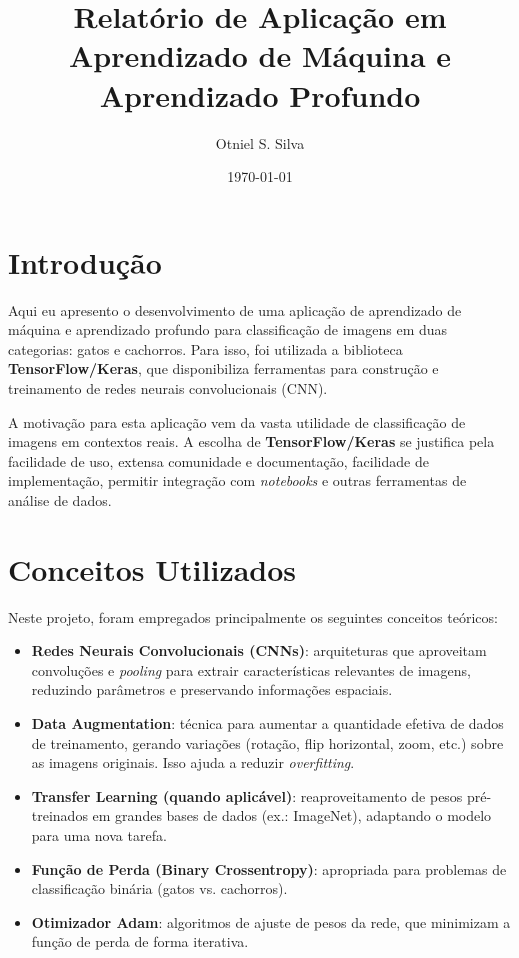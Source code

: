 \documentclass[a4paper,12pt]{article}
\title{Relatório de Aplicação em Aprendizado de Máquina e Aprendizado Profundo}
\author{Otniel S. Silva}
\date{\today}
\begin{document}
\maketitle

\section{Introdução}
Aqui eu apresento o desenvolvimento de uma aplicação de aprendizado de máquina e aprendizado profundo para classificação de imagens em duas categorias: gatos e cachorros. Para isso, foi utilizada a biblioteca \textbf{TensorFlow/Keras}, que disponibiliza ferramentas para construção e treinamento de redes neurais convolucionais (CNN).

A motivação para esta aplicação vem da vasta utilidade de classificação de imagens em contextos reais. A escolha de \textbf{TensorFlow/Keras} se justifica pela facilidade de uso, extensa comunidade e documentação, facilidade de implementação, permitir integração com \textit{notebooks} e outras ferramentas de análise de dados.

\section{Conceitos Utilizados}
Neste projeto, foram empregados principalmente os seguintes conceitos teóricos:
\begin{itemize}
    \item \textbf{Redes Neurais Convolucionais (CNNs)}: arquiteturas que aproveitam convoluções e \textit{pooling} para extrair características relevantes de imagens, reduzindo parâmetros e preservando informações espaciais.
    \item \textbf{Data Augmentation}: técnica para aumentar a quantidade efetiva de dados de treinamento, gerando variações (rotação, flip horizontal, zoom, etc.) sobre as imagens originais. Isso ajuda a reduzir \textit{overfitting}.
    \item \textbf{Transfer Learning (quando aplicável)}: reaproveitamento de pesos pré-treinados em grandes bases de dados (ex.: ImageNet), adaptando o modelo para uma nova tarefa. 
    \item \textbf{Função de Perda (Binary Crossentropy)}: apropriada para problemas de classificação binária (gatos vs. cachorros).
    \item \textbf{Otimizador Adam}: algoritmos de ajuste de pesos da rede, que minimizam a função de perda de forma iterativa.
\end{itemize}
\end{document}
